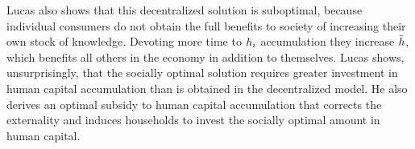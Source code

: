 \documentclass{handout}
\begin{document}
Lucas also shows that this decentralized solution is suboptimal,
because individual consumers do not obtain the full benefits to
society of increasing their own stock of knowledge.  Devoting more
time to $h_i$ accumulation they increase $\bar{h}$, which benefits all
others in the economy in addition to themselves.  Lucas shows,
unsurprisingly, that the socially optimal solution requires greater
investment in human capital accumulation than is obtained in the
decentralized model.  He also derives an optimal subsidy to human
capital accumulation that corrects the externality and induces
households to invest the socially optimal amount in human capital.


 

\end{document}
